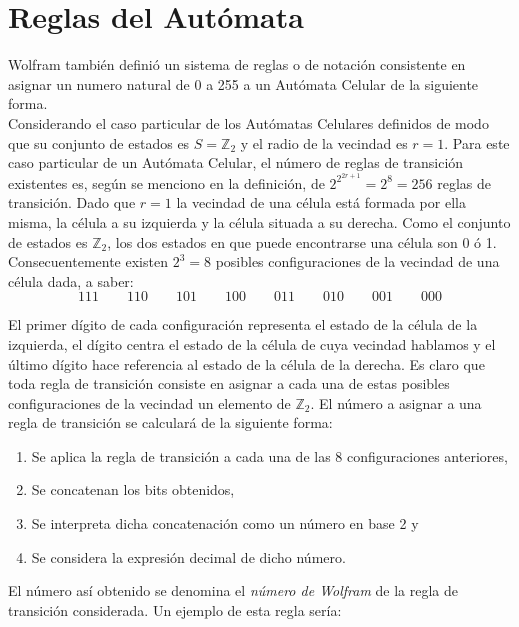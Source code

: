 
\section{Reglas del Autómata} %
Wolfram también definió un sistema de reglas o de notación consistente en asignar un numero natural de 0 a 255 a un Autómata Celular de la siguiente forma.\\

Considerando el caso particular de los Autómatas Celulares definidos de modo que su conjunto de estados es $S = \mathbb{Z}_2$ y el radio de la vecindad es $r = 1$. Para este caso particular de un Autómata Celular, el número de reglas de transición existentes es, según se menciono en la definición, de $2^{2^{2r+1}} = 2^8 = 256$ reglas de transición. Dado que $r = 1$ la vecindad de una célula está formada por ella misma, la célula a su izquierda y la célula situada a su derecha. Como el conjunto de estados es $\mathbb{Z}_2$, los dos estados en que puede encontrarse una célula son 0 ó 1. Consecuentemente existen $2^3 = 8$ posibles configuraciones de la vecindad de una célula dada, a saber: \\
$$111 \qquad 110 \qquad 101 \qquad 100 \qquad 011 \qquad 010 \qquad 001 \qquad 000$$

El primer dígito de cada configuración representa el estado de la célula de la izquierda, el dígito centra el estado de la célula de cuya vecindad hablamos y el último dígito hace referencia al estado de la célula de la derecha. Es claro que toda regla de transición consiste en asignar a cada una de estas posibles configuraciones de la vecindad un elemento de $\mathbb{Z}_2$. El número a asignar a una regla de transición se calculará de la siguiente forma:
\begin{enumerate}
 \item Se aplica la regla de transición a cada una de las 8 configuraciones anteriores,
 \item Se concatenan los bits obtenidos,
 \item Se interpreta dicha concatenación como un número en base 2 y
 \item Se considera la expresión decimal de dicho número.
\end{enumerate}

El número así obtenido se denomina el \textit{número de Wolfram} de la regla de transición considerada. Un ejemplo de esta regla sería:\\

